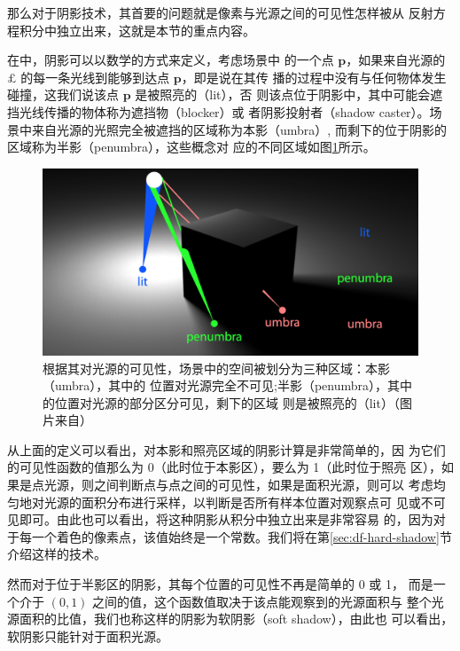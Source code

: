 那么对于阴影技术，其首要的问题就是像素与光源之间的可见性怎样被从 反射方程积分中独立出来，这就是本节的重点内容。

在\cite{b:rts}中，阴影可以以数学的方式来定义，考虑场景中 的一个点 $\mathbf{p}$，如果来自光源的 $\pounds$ 的每一条光线到能够到达点 $\mathbf{p}$，即是说在其传 播的过程中没有与任何物体发生碰撞，这我们说该点 $\mathbf{p}$ 是被照亮的（lit），否 则该点位于阴影中，其中可能会遮挡光线传播的物体称为遮挡物（blocker）或 者阴影投射者（shadow caster）。场景中来自光源的光照完全被遮挡的区域称为本影（umbra）, 而剩下的位于阴影的区域称为半影（penumbra），这些概念对 应的不同区域如图\ref{f:df-shadow-definition}所示。

\begin{figure}
	\includegraphics[width=\textwidth]{figures/shadows/shadow-definition}
	\caption{根据其对光源的可见性，场景中的空间被划分为三种区域：本影（umbra），其中的 位置对光源完全不可见;半影（penumbra），其中的位置对光源的部分区分可见，剩下的区域 则是被照亮的（lit）（图片来自\cite{b:rts}）}
	\label{f:df-shadow-definition}
\end{figure}

从上面的定义可以看出，对本影和照亮区域的阴影计算是非常简单的，因 为它们的可见性函数的值那么为 0（此时位于本影区），要么为 1（此时位于照亮 区），如果是点光源，则之间判断点与点之间的可见性，如果是面积光源，则可以 考虑均匀地对光源的面积分布进行采样，以判断是否所有样本位置对观察点可 见或不可见即可。由此也可以看出，将这种阴影从积分中独立出来是非常容易 的，因为对于每一个着色的像素点，该值始终是一个常数。我们将在第\ref{sec:df-hard-shadow}节 介绍这样的技术。

然而对于位于半影区的阴影，其每个位置的可见性不再是简单的 0 或 1， 而是一个介于 $(0,1)$ 之间的值，这个函数值取决于该点能观察到的光源面积与 整个光源面积的比值，我们也称这样的阴影为软阴影（soft shadow），由此也 可以看出，软阴影只能针对于面积光源。

